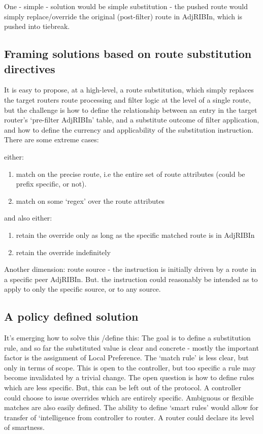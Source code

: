 One - simple - solution would be simple substitution - the pushed route would
simply replace/override the original (post-filter) route in AdjRIBIn, which is
pushed into tiebreak.

\subsection{Framing solutions based on route substitution directives}

It is easy to propose, at a high-level, a route substitution, which simply replaces the target routers route processing and filter logic at the level of a single route,
but the challenge is how to
define the relationship between an entry in the target router's `pre-filter AdjRIBIn' table, and a substitute outcome of filter application, and how to define the currency and
applicability of the substitution instruction.	There are some extreme cases:

either:
\begin{enumerate}
	\item  match on the precise route, i.e the entire set of route attributes (could be prefix specific, or not).
	\item  match on some `regex' over the route attributes
\end{enumerate}

and also either:
\begin{enumerate}
	\item  retain the override only as long as the specific matched route is in AdjRIBIn
	\item  retain the override indefinitely
\end{enumerate}

Another dimension: route source - the instruction is initially driven by a
route in a specific peer AdjRIBIn.  But. the instruction could reasonably be
intended as to apply to only the specific source, or to any source.

\subsection{A policy defined solution}

It's emerging how to solve this /define this:
The goal is to define a substitution rule, and so far the substituted value is
clear and concrete - mostly the important factor is the assignment of
Local Preference.  The `match rule' is less clear, but only in terms of scope.
This is open to the controller, but too specific a rule may become invalidated by a
trivial change.  The open question is how to define rules which are less
specific.  But, this can be left out of the protocol.  A controller could
choose to issue overrides which are entirely specific. Ambiguous or flexible
matches are also easily defined.
The ability to define `smart rules' would allow for transfer of `intelligence from controller to router.
A router could declare its level of smartness.

